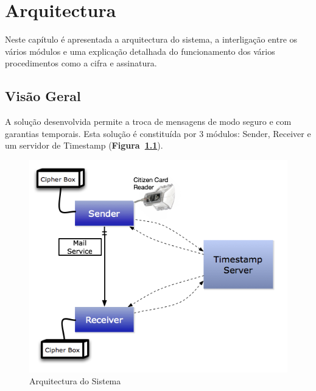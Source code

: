 \clearpage

\chapter{Arquitectura}
\label{chapter:architecture}
Neste capítulo é apresentada a arquitectura do sistema, a interligação entre os vários módulos e uma explicação  detalhada do funcionamento dos vários procedimentos como a cifra e assinatura.
\section{Visão Geral}
\label{section:estrutura}
A solução desenvolvida permite a troca de mensagens de modo seguro e com garantias temporais. Esta solução é constituída por 3 módulos: Sender, Receiver e um servidor de Timestamp (\textbf{Figura~\ref{fig:chart}}).\\

\begin{figure}[htp]
\centering 
\includegraphics[width=12cm]{./Figures/chart.png}
\caption{Arquitectura do Sistema}
\label{fig:chart}
\end{figure}


